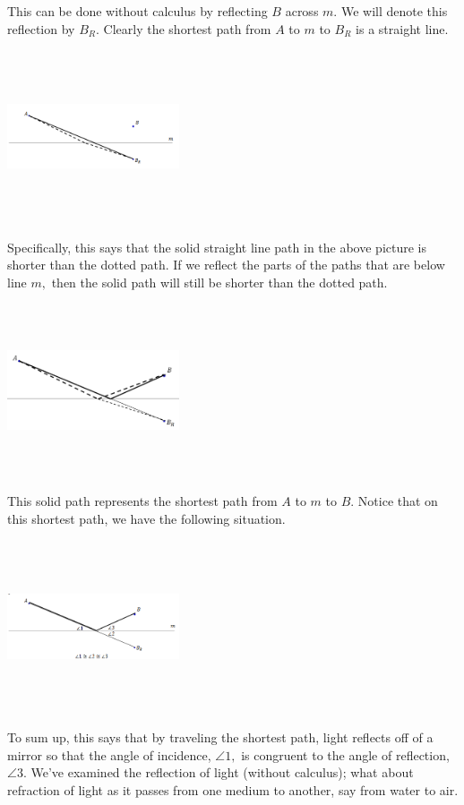 This can be done without calculus by reflecting $B$ across $m.$  We will
denote this reflection by $B_R.$  Clearly the shortest path from $A$ to $m$
to $B_R$ is a straight line.

\includegraphics*[height=2in,width=2in]{Figures/Fermat2}

Specifically, this says that the solid straight line path in the above
picture is shorter than the dotted path.  If we reflect the parts of
the paths that are below line $m,$ then the solid path will still be
shorter than the dotted path. 

\includegraphics*[height=2in,width=2in]{Figures/Fermat3}

This solid path represents the shortest path from $A$ to $m$ to $B.$
Notice that on this shortest path, we have the following situation.

\includegraphics*[height=2in,width=2in]{Figures/Fermat4}

To sum up, this says that by traveling the shortest path, light
reflects off of a mirror so that the angle of incidence, $\angle 1,$ is
congruent to the angle of reflection, $\angle 3.$  We've examined the
reflection of light (without calculus); what about refraction of light
as it passes from one medium to another, say from water to air.

